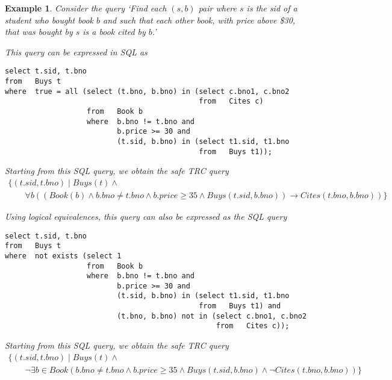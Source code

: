 \documentclass[11pt]{article}
\newtheorem{example}{Example}
\begin{document}
\begin{example}
\label{TranslatedSQLtoSafeTRC}
Consider the query `\emph{Find each $(s,b)$ pair where $s$ is the
sid of a student who bought book $b$ and such that each other book, with price above \$30, that was bought by $s$ is a book cited by $b$}.'


This query can be expressed in SQL as
{\small
\begin{verbatim}
select t.sid, t.bno
from   Buys t
where  true = all (select (t.bno, b.bno) in (select c.bno1, c.bno2
                                             from   Cites c)
                   from   Book b
                   where  b.bno != t.bno and 
                          b.price >= 30 and
                          (t.sid, b.bno) in (select t1.sid, t1.bno
                                             from   Buys t1));
\end{verbatim}
}
                                                                
Starting from this SQL query, we obtain the safe TRC query
{\small
\[
\begin{array}{l}
\{(t.sid,t.bno)\mid Buys(t) \land \\
\qquad \forall b\left((Book(b)\land b.bno \neq t.bno\land b.price \geq 35 \land Buys(t.sid, b.bno))\rightarrow Cites(t.bno,b.bno)\right)\}
\end{array}
\]  }                                                              
%

Using logical equivalences, this query can also be expressed as the SQL query
{\small
\begin{verbatim}
select t.sid, t.bno
from   Buys t
where  not exists (select 1
                   from   Book b
                   where  b.bno != t.bno and 
                          b.price >= 30 and
                          (t.sid, b.bno) in (select t1.sid, t1.bno
                                             from   Buys t1) and
                          (t.bno, b.bno) not in (select c.bno1, c.bno2
                                                 from   Cites c));
\end{verbatim}
}
  
Starting from this SQL query, we obtain the safe TRC query
{\small
\[
\begin{array}{l}
\{(t.sid,t.bno)\mid Buys(t) \land \\
\qquad \lnot \exists b\in Book \left(b.bno \neq t.bno\land b.price \geq 35 \land Buys(t.sid, b.bno)\land \lnot Cites(t.bno,b.bno)\right)\}
\end{array}
\]  }                                                              

\end{example}
\end{document}

